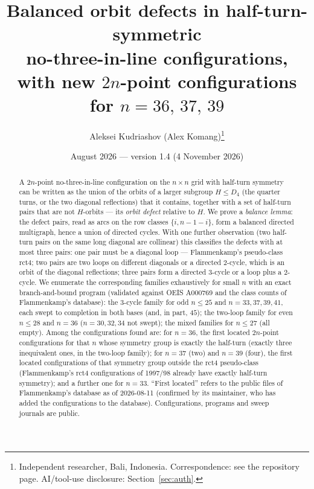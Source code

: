 \documentclass[11pt]{article}
\title{Balanced orbit defects in half-turn-symmetric\\ no-three-in-line configurations,\\
with new $2n$-point configurations for $n=36,\,37,\,39$}
\author{Aleksei Kudriashov (Alex Komang)\thanks{Independent researcher, Bali, Indonesia.  Correspondence: see the repository page.
AI/tool-use disclosure: Section~\ref{sec:auth}.}}
\date{August 2026 --- version 1.4 (4 November 2026)}
\theoremstyle{remark}
\newcommand{\Dfour}{D_4}
\begin{document}
\maketitle

\begin{abstract}
A $2n$-point no-three-in-line configuration on the $n\times n$ grid with half-turn symmetry can be written as the union
of the orbits of a larger subgroup $H\le\Dfour$ (the quarter turns, or the two diagonal reflections) that it contains,
together with a set of half-turn pairs that are not $H$-orbits --- its \emph{orbit defect} relative to $H$.  We prove a
\emph{balance lemma}: the defect pairs, read as arcs on the row classes $\{i,n-1-i\}$, form a balanced directed
multigraph, hence a union of directed cycles.  With one further observation (two half-turn pairs on the same long
diagonal are collinear) this classifies the defects with at most three pairs: one pair must be a diagonal loop ---
Flammenkamp's pseudo-class rct4; two pairs are two loops on different diagonals or a directed $2$-cycle, which is an
orbit of the diagonal reflections; three pairs form a directed $3$-cycle or a loop plus a $2$-cycle.  We enumerate the
corresponding families exhaustively for small $n$ with an exact branch-and-bound program (validated against OEIS A000769
and the class counts of Flammenkamp's database): the $3$-cycle family for odd $n\le25$ and $n=33,37,39,41$, each swept to completion in both bases (and, in part, $45$); the two-loop family for even $n\le28$ and $n=36$ ($n=30,32,34$ not swept); the mixed families for $n\le27$ (all empty).  Among the
configurations found are: for $n=36$, the first located $2n$-point configurations for that $n$ whose symmetry group is exactly the
half-turn (exactly three inequivalent ones, in the two-loop family); for $n=37$ (two) and $n=39$ (four), the first located configurations of that
symmetry group outside the rct4 pseudo-class (Flammenkamp's rct4 configurations of 1997/98 already have exactly
half-turn symmetry); and a further one for $n=33$.  ``First located'' refers to the public files of Flammenkamp's
database as of 2026-08-11 (confirmed by its maintainer, who has added the configurations to the database).  Configurations,
programs and sweep journals are public.
\end{abstract}
\end{document}
